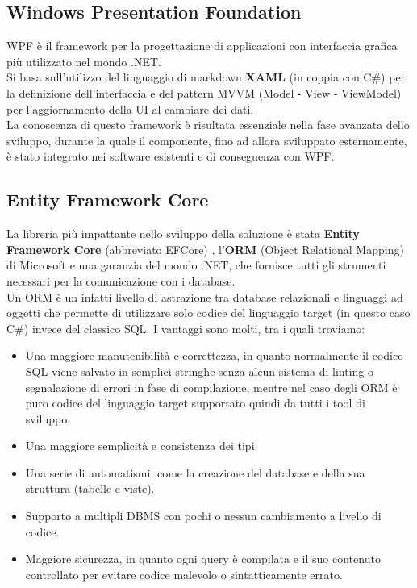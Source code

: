 \documentclass[\main/Tesi.tex]{subfiles}
\begin{document}
\subsection{Windows Presentation Foundation}
WPF è il framework per la progettazione di applicazioni con interfaccia grafica più utilizzato nel mondo .NET.\\
Si basa sull'utilizzo del linguaggio di markdown \textbf{XAML} \cite{xaml} (in coppia con C\#) per la definizione dell'interfaccia e del pattern MVVM (Model - View - ViewModel) \cite{mvvm} per l'aggiornamento della UI al cambiare dei dati.\\
La conoscenza di questo framework è risultata essenziale nella fase avanzata dello sviluppo, durante la quale il componente, fino ad allora sviluppato esternamente, è stato integrato nei software esistenti e di conseguenza con WPF.

\subsection{Entity Framework Core}
\label{efcore}
La libreria più impattante nello sviluppo della soluzione è stata \textbf{Entity Framework Core} (abbreviato EFCore) \cite{efcore}, l'\textbf{ORM} (Object Relational Mapping) di Microsoft e una garanzia del mondo .NET, che fornisce tutti gli strumenti necessari per la comunicazione con i database.\\
Un ORM è un infatti livello di astrazione tra database relazionali e linguaggi ad oggetti che permette di utilizzare solo codice del linguaggio target (in questo caso C\#) invece del classico SQL. I vantaggi sono molti, tra i quali troviamo:
\begin{itemize}
    \item Una maggiore manutenibilità e correttezza, in quanto normalmente il codice SQL viene salvato in semplici stringhe senza alcun sistema di linting o segnalazione di errori in fase di compilazione, mentre nel caso degli ORM è puro codice del linguaggio target supportato quindi da tutti i tool di sviluppo.
    \item Una maggiore semplicità e consistenza dei tipi.
    \item Una serie di automatismi, come la creazione del database e della sua struttura (tabelle e viste).
    \item Supporto a multipli DBMS con pochi o nessun cambiamento a livello di codice.
    \item Maggiore sicurezza, in quanto ogni query è compilata e il suo contenuto controllato per evitare codice malevolo o sintatticamente errato.
\end{itemize}
\end{document}
